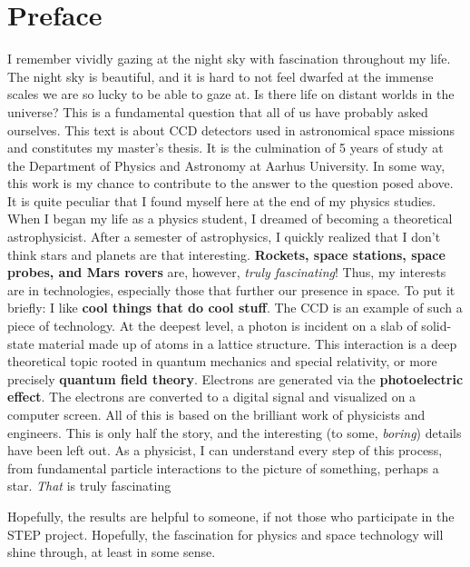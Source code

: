 \documentclass[../main.tex]{subfiles}
\begin{document}
	\chapter*{Preface}
	
	I remember vividly gazing at the night sky with fascination throughout my life. The night sky is beautiful, and it is hard to not feel dwarfed at the immense scales we are so lucky to be able to gaze at. Is there life on distant worlds in the universe? This is a fundamental question that all of us have probably asked ourselves. 
	This text is about CCD detectors used in astronomical space missions and constitutes my master's thesis. It is the culmination of 5 years of study at the Department of Physics and Astronomy at Aarhus University. In some way, this work is my chance to contribute to the answer to the question posed above. It is quite peculiar that I found myself here at the end of my physics studies. 
	When I began my life as a physics student, I dreamed of becoming a theoretical astrophysicist. After a semester of astrophysics, I quickly realized that I don't think stars and planets are that interesting. \textbf{Rockets, space stations, space probes, and Mars rovers} are, however, \textit{truly fascinating}! Thus, my interests are in technologies, especially those that further our presence in space. To put it briefly: I like \textbf{cool things that do cool stuff}. The CCD is an example of such a piece of technology. At the deepest level, a photon is incident on a slab of solid-state material made up of atoms in a lattice structure. This interaction is a deep theoretical topic rooted in quantum mechanics and special relativity, or more precisely \textbf{quantum field theory}. Electrons are generated via the \textbf{photoelectric effect}. The electrons are converted to a digital signal and visualized on a computer screen. All of this is based on the brilliant work of physicists and engineers. This is only half the story, and the interesting (to some, \textit{boring}) details have been left out. As a physicist, I can understand every step of this process, from fundamental particle interactions to the picture of something, perhaps a star. \textit{That} is truly fascinating
	
	Hopefully, the results are helpful to someone, if not those who participate in the STEP project. Hopefully, the fascination for physics and space technology will shine through, at least in some sense.
	\clearpage
	\thispagestyle{empty}
	\mbox{}
\end{document}
